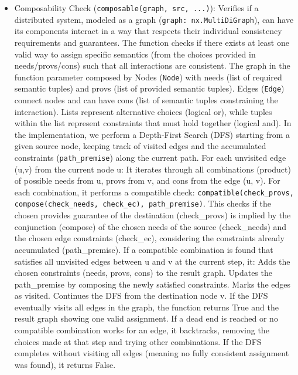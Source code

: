 \begin{itemize}
\begin{itemize}
      \item Composability Check (\texttt{composable(graph, src,
        ...)}): Verifies if a distributed
        system, modeled as a graph (\texttt{graph: nx.MultiDiGraph}),
        can have its components
        interact in a way that respects their individual consistency
        requirements and
        guarantees. The function checks if there exists at least one
        valid way to assign
        specific semantics (from the choices provided in
        needs/provs/cons) such that all
        interactions are consistent. The graph in the function
        parameter composed by
        Nodes (\texttt{Node}) with needs (list of required semantic
        tuples) and provs (list of
        provided semantic tuples). Edges (\texttt{Edge}) connect
        nodes and can have cons (list
        of semantic tuples constraining the interaction). Lists
        represent alternative
        choices (logical or), while tuples within the list represent
        constraints that
        must hold together (logical and). In the implementation, we perform a
        Depth-First Search (DFS) starting from a given source node,
        keeping track of
        visited edges and the accumulated constraints
        (\texttt{path\_premise}) along the current
        path. For each unvisited edge (u,v) from the current node u:
        It iterates through
        all combinations (product) of possible needs from u, provs
        from v, and cons from
        the edge (u, v). For each combination, it performs a
        compatible check: \texttt{compatible(check\_provs,
        compose(check\_needs, check\_ec), path\_premise)}.
        This checks if the chosen provides guarantee of the
        destination (check\_provs) is
        implied by the conjunction (compose) of the chosen needs of the source
        (check\_needs) and the chosen edge constraints (check\_ec),
        considering the
        constraints already accumulated (path\_premise). If a
        compatible combination is
        found that satisfies all unvisited edges between u and v at
        the current step,
        it: Adds the chosen constraints (needs, provs, cons) to the
        result graph.
        Updates the path\_premise by composing the newly satisfied
        constraints. Marks the
        edges as visited. Continues the DFS from the destination node
        v. If the DFS
        eventually visits all edges in the graph, the function
        returns True and the
        result graph showing one valid assignment. If a dead end is
        reached or no
        compatible combination works for an edge, it backtracks,
        removing the choices
        made at that step and trying other combinations. If the DFS
        completes without
        visiting all edges (meaning no fully consistent assignment
        was found), it
        returns False.


\end{itemize}
\end{itemize}
